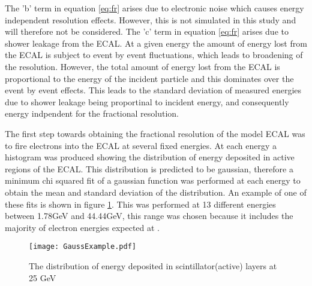 The 'b' term in equation \ref{eq:fr} arises due to electronic noise which causes energy independent resolution effects.  However, this is not simulated in this study and will therefore not be considered.  The 'c' term in equation \ref{eq:fr} arises due to shower leakage from the ECAL.  At a given energy the amount of energy lost from the ECAL is subject to event by event fluctuations, which leads to broadening of the resolution.  However, the total amount of energy lost from the ECAL is proportional to the energy of the incident particle and this dominates over the event by event effects.  This leads to the standard deviation of measured energies due to shower leakage being proportinal to incident energy, and consequently energy indpendent for the fractional resolution.

The first step towards obtaining the fractional resolution of the model ECAL was to fire electrons into the ECAL at several fixed energies.  At each energy a histogram was produced showing the distribution of energy deposited in active regions of the ECAL.  This distribution is predicted to be gaussian, therefore a minimum chi squared fit of a gaussian function was performed at each energy to obtain the mean and standard deviation of the distribution. An example of one of these fits is shown in figure \ref{fig:Gauss}.  This was performed at 13 different energies between 1.78GeV and 44.44GeV, this range was chosen because it includes the majority of electron energies expected at \lhcb.

\begin{figure}[h!]
  \centering
  \texttt{[image: GaussExample.pdf]}
  \caption{The distribution of energy deposited in scintillator(active) layers at 25 GeV}
  \label{fig:Gauss}
\end{figure}

